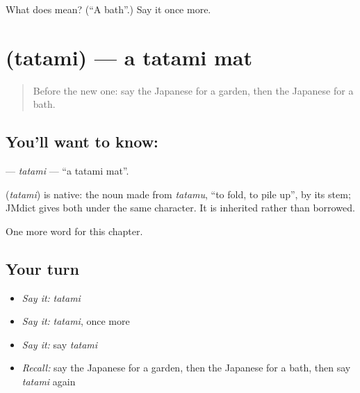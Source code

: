\begin{tcolorbox}[breakable,colback=teal!4,colframe=teal!35!black,title={Before you move on}]
What does  mean? (\textquotedblleft{}A bath\textquotedblright{}.) Say it once more.
\end{tcolorbox}
\section[\texorpdfstring{\ja{たたみ} (tatami)}{たたみ (tatami)}]{ (tatami) — a tatami mat}

\label{lesson:JA-C39-tatami}



\begin{quote}
Before the new one: say the Japanese for a garden, then the Japanese for a bath.
\end{quote}

\subsection*{You'll want to know: }
\textbf{} — \emph{tatami} — \textquotedblleft{}a tatami mat\textquotedblright{}.

\begin{cousinweb}
\textbf{} (\emph{tatami}) is native: the noun made from \emph{tatamu}, \textquotedblleft{}to fold, to pile up\textquotedblright{}, by its stem; JMdict gives both under the same character. It is inherited rather than borrowed.
\end{cousinweb}

\begin{grammarlens}[title={What you've built}]
One more word for this chapter.
\end{grammarlens}

\subsection*{Your turn}
\begin{itemize}
\raggedright
  \item \emph{Say it:} \emph{tatami}
  \item \emph{Say it:} \emph{tatami}, once more
  \item \emph{Say it:} say \emph{tatami}
  \item \emph{Recall:} say the Japanese for a garden, then the Japanese for a bath, then say \emph{tatami} again
\end{itemize}

